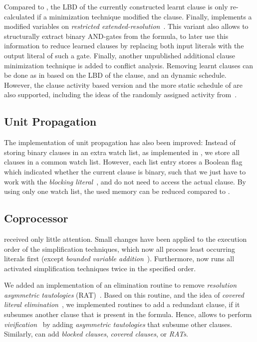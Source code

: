 \documentclass[conference]{IEEEtran}
\begin{document}
Compared to \glucose, the LBD of the currently constructed learnt clause is only re-calculated if a minimization technique modified the clause.
Finally, \riss implements a modified variables on \emph{restricted extended-resolution}~\cite{glucoseER,dedtreff2014}. 
This variant also allows to structurally extract binary AND-gates from the formula, to later use this information to reduce learned clauses by replacing both input literals with the output literal of such a gate. 
Finally, another unpublished additional clause minimization technique is added to conflict analysis. 
Removing learnt clauses can be done as in \glucose based on the LBD of the clause, and an dynamic schedule. 
However, the clause activity based version and the more static schedule of \minisat are also supported, including the ideas of the randomly assigned activity from~\cite{frenchPaper}. 

\subsection{Unit Propagation}

The implementation of unit propagation has also been improved: 
Instead of storing binary clauses in an extra watch list, as implemented in \glucose, we store all clauses in a common watch list. 
However, each list entry stores a Boolean flag which indicated whether the current clause is binary, such that we just have to work with the \emph{blocking literal}~\cite{minisat21}, and do not need to access the actual clause. 
By using only one watch list, the used memory can be reduced compared to \glucose.

\subsection{Coprocessor}

\coprocessor received only little attention. 
Small changes have been applied to the execution order of the simplification techniques, which now all process least occurring literals first (except \emph{bounded variable addition}~\cite{Mbva}). 
Furthermore, \coprocessor now runs all activated simplification techniques twice in the specified order. 

We added an implementation of an elimination routine to remove \emph{resolution asymmetric tautologies} (RAT)~\cite{?}. 
Based on this routine, and the idea of \emph{covered literal elimination}~\cite{MantheyP:KI:2014}, we implemented routines to add a redundant clause, if it subsumes another clause that is present in the formula. 
Hence, \coprocessor allows to perform \emph{vivification}~\cite{?} by adding \emph{asymmetric tautologies} that subsume other clauses. 
Similarly, \coprocessor can add \emph{blocked clauses}, \emph{covered clauses}, or \emph{RATs}. 
\end{document}
